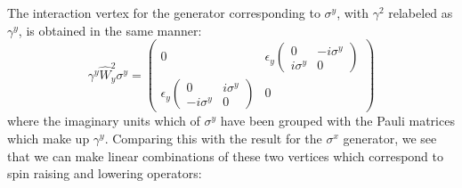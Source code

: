 \documentclass[prb,showpacs,superscriptaddress,titlepage,amsmath,amssymb,twocolumn]{revtex4-1}
\begin{document}
The interaction vertex for the generator corresponding to $\sigma^{y}$, with $\gamma^{2}$ relabeled as $\gamma^{y}$, is obtained in the same manner:
\begin{equation}
\gamma^{y}\hat{W}^{2}_{y}\sigma^{y} = \begin{pmatrix}0&\epsilon_{y}\begin{pmatrix}0&-i\sigma^{y}\\i\sigma^{y}&0\end{pmatrix}\\\epsilon_{y}\begin{pmatrix}0&i\sigma^{y}\\-i\sigma^{y}&0\end{pmatrix}&0\end{pmatrix}
\end{equation}
\quad
where the imaginary units which of $\sigma^{y}$ have been grouped with the Pauli matrices which make up $\gamma^{y}$. Comparing this with the result for the $\sigma^{x}$ generator, we see that we can make linear combinations of these two vertices which correspond to spin raising and lowering operators:
\end{document}
